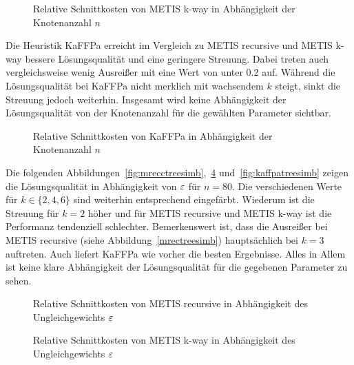 \begin{figure}[H]
    \centering
    
    \caption{Relative Schnittkosten von METIS k-way in Abhängigkeit der Knotenanzahl $n$\label{fig:mkwaytreesnodes}}
\end{figure}

Die Heuristik KaFFPa erreicht im Vergleich zu METIS recursive und METIS k-way bessere Lösungsqualität und eine geringere Streuung.
Dabei treten auch vergleichsweise wenig Ausreißer mit eine Wert von unter $0.2$ auf.
Während die Lösungsqualität bei KaFFPa nicht merklich mit wachsendem $k$ steigt, sinkt die Streuung jedoch weiterhin.
Insgesamt wird keine Abhängigkeit der Lösungsqualität von der Knotenanzahl für die gewählten Parameter sichtbar.

\begin{figure}[H]
    \centering
    
    \caption{Relative Schnittkosten von KaFFPa in Abhängigkeit der Knotenanzahl $n$\label{fig:kaffpatreesnodes}}
\end{figure}

Die folgenden Abbildungen~\ref{fig:mrecctreesimb},~\ref{fig:mkwaytreesimb} und~\ref{fig:kaffpatreesimb} zeigen die Lösungsqualität in Abhängigkeit von $\varepsilon$ für $n=80$.
Die verschiedenen Werte für $k \in \{2,4,6\}$ sind weiterhin entsprechend eingefärbt.
Wiederum ist die Streuung für $k=2$ höher und für METIS recursive und METIS k-way ist die Performanz tendenziell schlechter.
Bemerkenswert ist, dass die Ausreißer bei METIS recursive (siehe Abbildung~\ref{mrectreesimb}) hauptsächlich bei $k=3$ auftreten.
Auch liefert KaFFPa wie vorher die besten Ergebnisse.
Alles in Allem ist keine klare Abhängigkeit der Lösungsqualität für die gegebenen Parameter zu sehen.

\begin{figure}[H]
    \centering
    
    \caption{Relative Schnittkosten von METIS recursive in Abhängigkeit des Ungleichgewichts $\varepsilon$\label{fig:mrectreesimb}}
\end{figure}

\begin{figure}[H]
    \centering
    
    \caption{Relative Schnittkosten von METIS k-way in Abhängigkeit des Ungleichgewichts $\varepsilon$\label{fig:mkwaytreesimb}}
\end{figure}

